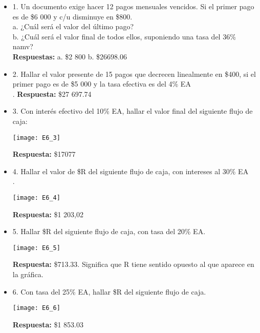 \begin{itemize}
	\item 1. Un documento exige hacer 12 pagos mensuales vencidos. Si el primer pago es de \$6 000 y c/u disminuye en \$800.\\
	
	a. ¿Cuál será el valor del último pago?\\
	b. ¿Cuál será el valor final de todos ellos, suponiendo una tasa del 36\% namv?\\
	\textbf{Respuestas:} a. \$2 800 \hspace{ 0,5cm} b. \$26698.06\\
	\medskip
	
	\item 2. Hallar el valor presente de 15 pagos que decrecen linealmente en \$400, si el primer pago es de \$5 000 y la tasa efectiva es del 4\% EA\\.
	\textbf{Respuesta:} \$27 697.74\\
	\medskip
	
	\item 3. Con interés efectivo del 10\% EA, hallar el valor final del siguiente flujo de caja:\\
	\begin{center}
		\texttt{[image: E6\_3]}
	\end{center}
	\textbf{Respuesta:} \$17077\\
	\medskip
	
	\item 4. Hallar el valor de \$R del siguiente flujo de caja, con intereses al 30\% EA\\.
	\begin{center}
		\texttt{[image: E6\_4]}
	\end{center}
	\textbf{Respuesta:} \$1 203,02\\
	\medskip
	
	\item 5. Hallar \$R del siguiente flujo de caja, con tasa del 20\% EA.    
	\begin{center}
		\texttt{[image: E6\_5]}
	\end{center}
	\textbf{Respuesta:} \$713.33. Significa que R tiene sentido opuesto al que aparece en la gráfica.\\
	\medskip
	
	\item 6. Con tasa del 25\% EA, hallar \$R del siguiente flujo de caja.
	\begin{center}
		\texttt{[image: E6\_6]}
	\end{center}
	\textbf{Respuesta:} \$1 853.03\\
	\medskip
	

\end{itemize}
